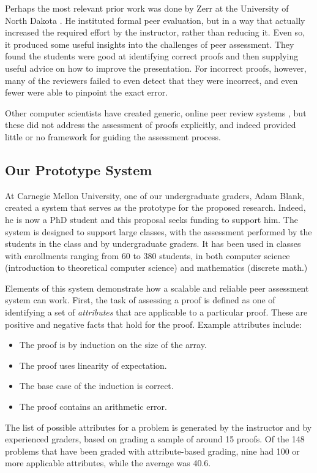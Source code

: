 \documentclass[12pt]{article}
\begin{document}
Perhaps the most relevant prior work was done by Zerr at the
University of North Dakota \cite{zerr-primus11}.
He instituted formal peer evaluation, but
in a way that actually increased the required effort by the
instructor, rather than reducing it.  Even so, it produced some
useful insights into the challenges of peer assessment.  They found
the students were good at identifying correct proofs and then
supplying useful advice on how to improve the presentation.  For
incorrect proofs, however, many of the reviewers failed to even detect
that they were incorrect, and even fewer were able to pinpoint the exact error.

Other computer scientists have created generic, online peer review systems
\cite{gehringer-sigcse05, wolfe-ite04}, but these did not address the
assessment of proofs explicitly, and indeed provided little or no
framework for guiding the assessment process.

\subsection{Our Prototype System}

At Carnegie Mellon University, one of our undergraduate graders, Adam
Blank, created a system that serves as the prototype for the proposed
research.  Indeed, he is now a PhD student and this proposal seeks
funding to support him.  The system is designed to support large classes,
with the assessment performed by the students in the class and by
undergraduate graders.  It has been used in classes with enrollments
ranging from 60 to 380 students, in both computer science (introduction
to theoretical computer science) and mathematics (discrete math.)

Elements of this system demonstrate 
how a scalable and reliable peer assessment system can work.  First,
the task of assessing a proof is defined as one of identifying a set of
{\em attributes} that are applicable to a particular proof.  These are
positive and negative facts that hold for the proof.  Example
attributes include:
\begin{itemize}
\item The proof is by induction on the size of the array.
\item The proof uses linearity of expectation.
\item The base case of the induction is correct.
\item The proof contains an arithmetic error.
\end{itemize}
The list of possible attributes for a problem is generated by the
instructor and by experienced graders, based on grading a sample of
around 15 proofs.  Of the 148 problems that have been graded with
attribute-based grading, nine had 100 or more applicable attributes,
while the average was 40.6.  
\end{document}
